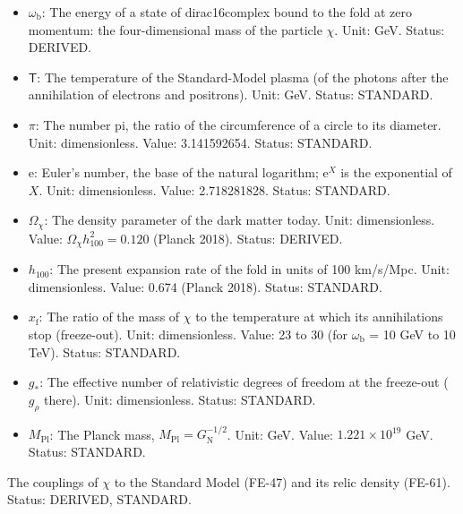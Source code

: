 \documentclass[
  10pt,
]{article}
\begin{document}
\begin{itemize}
  DERIVED.
\item
  \(\omega_{\mathrm{b}}\): The energy of a state of dirac16complex bound
  to the fold at zero momentum: the four-dimensional mass of the
  particle \(\chi\). Unit: GeV. Status: DERIVED.
\item
  \(\mathsf{T}\): The temperature of the Standard-Model plasma (of the
  photons after the annihilation of electrons and positrons). Unit: GeV.
  Status: STANDARD.
\item
  \(\pi\): The number pi, the ratio of the circumference of a circle to
  its diameter. Unit: dimensionless. Value: 3.141592654. Status:
  STANDARD.
\item
  \(\mathrm{e}\): Euler's number, the base of the natural logarithm;
  \(\mathrm{e}^{X}\) is the exponential of \(X\). Unit: dimensionless.
  Value: 2.718281828. Status: STANDARD.
\item
  \(\Omega_\chi\): The density parameter of the dark matter today. Unit:
  dimensionless. Value: \(\Omega_\chi h_{100}^2 = 0.120\) (Planck 2018).
  Status: DERIVED.
\item
  \(h_{100}\): The present expansion rate of the fold in units of 100
  km/s/Mpc. Unit: dimensionless. Value: 0.674 (Planck 2018). Status:
  STANDARD.
\item
  \(x_{\mathrm{f}}\): The ratio of the mass of \(\chi\) to the
  temperature at which its annihilations stop (freeze-out). Unit:
  dimensionless. Value: 23 to 30 (for \(\omega_{\mathrm{b}}\) = 10 GeV
  to 10 TeV). Status: STANDARD.
\item
  \(g_*\): The effective number of relativistic degrees of freedom at
  the freeze-out (\(g_\rho\) there). Unit: dimensionless. Status:
  STANDARD.
\item
  \(M_{\mathrm{Pl}}\): The Planck mass,
  \(M_{\mathrm{Pl}} = G_{\mathrm{N}}^{-1/2}\). Unit: GeV. Value:
  \(1.221\times10^{19}\) GeV. Status: STANDARD.
\end{itemize}

The couplings of \(\chi\) to the Standard Model (FE-47) and its relic
density (FE-61). Status: DERIVED, STANDARD.
\end{document}
